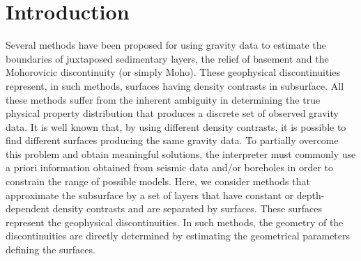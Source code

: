 \documentclass[manuscript]{geophysics}
\begin{document}
\section{Introduction}

Several methods have been proposed for using gravity data
to estimate the boundaries of juxtaposed sedimentary layers, 
the relief of basement and the Mohorovicic discontinuity (or simply Moho).
These geophysical discontinuities represent, in such methods, 
surfaces having density contrasts in subsurface.
All these methods suffer from the inherent ambiguity \citep{skeels1947, roy1962} in
determining the true physical property distribution that produces a discrete set of
observed gravity data. 
It is well known that, by using different density contrasts, 
it is possible to find different surfaces producing the same gravity data. 
To partially overcome this problem and obtain meaningful solutions, the interpreter
must commonly use a priori information obtained from seismic data and/or boreholes in
order to constrain the range of possible models.
Here, we consider methods that approximate the subsurface by a set of layers 
that have constant or depth-dependent density contrasts and are separated 
by surfaces. These surfaces represent the geophysical discontinuities.
In such methods, the geometry of the discontinuities are directly 
determined by estimating the geometrical parameters defining the surfaces.
\end{document}
